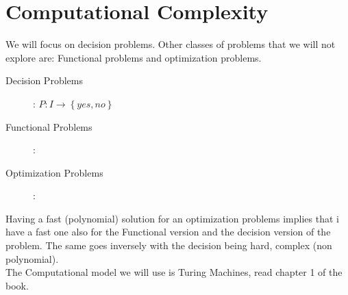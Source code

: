 \section*{Computational Complexity}
We will focus on decision problems. Other classes of problems that we will not explore are: Functional problems and optimization problems.\\
\begin{description}
    \item[Decision Problems] : $P: I \longrightarrow \left\{ yes, no \right\}$
    \item[Functional Problems] :
    \item[Optimization Problems] :
\end{description}
Having a fast (polynomial) solution for an optimization problems implies that i have a fast one also for the Functional version and the decision version of the problem. The same goes inversely with the decision being hard, complex (non polynomial).\\
The Computational model we will use is Turing Machines, read chapter 1 of the book.\\
